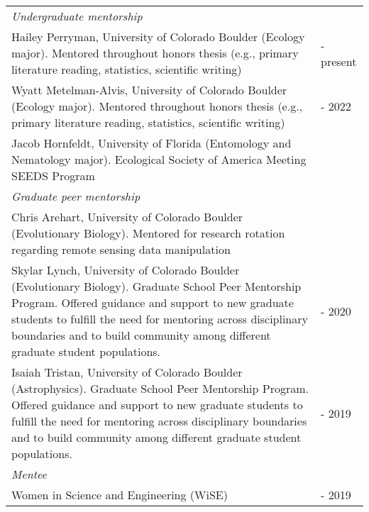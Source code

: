 \begin{longtable}{@{}>{\raggedright}p{5.25in} >{\raggedleft}X@{}}
 \addlinespace[1ex]
 
\emph{Undergraduate mentorship}  & \tabularnewline
Hailey Perryman, University of Colorado Boulder (Ecology major). Mentored throughout honors thesis (e.g., primary literature reading, statistics, scientific writing)  & 2022 - present \tabularnewline
Wyatt Metelman-Alvis, University of Colorado Boulder (Ecology major). Mentored throughout honors thesis (e.g., primary literature reading, statistics, scientific writing)  & 2021 - 2022 \tabularnewline
Jacob Hornfeldt, University of Florida (Entomology and Nematology major). Ecological Society of America Meeting SEEDS Program & 2020  \tabularnewline
 \addlinespace[1ex]
 
\emph{Graduate peer mentorship}  & \tabularnewline
Chris Arehart, University of Colorado Boulder (Evolutionary Biology). Mentored for research rotation regarding remote sensing data manipulation & 2021 \tabularnewline
Skylar Lynch, University of Colorado Boulder (Evolutionary Biology). Graduate School Peer Mentorship Program. Offered guidance and support to new graduate students to fulfill the need for mentoring across disciplinary boundaries and to build community among different graduate student populations. & 2019 - 2020 \tabularnewline
Isaiah Tristan, University of Colorado Boulder (Astrophysics). Graduate School Peer Mentorship Program. Offered guidance and support to new graduate students to fulfill the need for mentoring across disciplinary boundaries and to build community among different graduate student populations.  & 2018 - 2019  \tabularnewline
 \addlinespace[1ex]
 
\emph{Mentee}  & \tabularnewline
Women in Science and Engineering (WiSE) & 2018 - 2019 \tabularnewline

\end{longtable}


